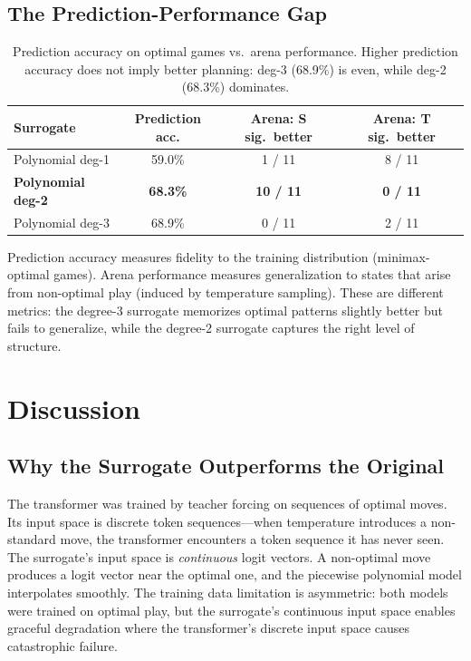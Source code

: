 \documentclass[11pt]{article}
\theoremstyle{definition}
\begin{document}
\subsection{The Prediction-Performance Gap}

\begin{table}[H]
\centering\small
\begin{tabular}{lccc}
\toprule
Surrogate & Prediction acc. & Arena: S sig.\ better & Arena: T sig.\ better \\
\midrule
Polynomial deg-1 & 59.0\% & 1 / 11 & 8 / 11 \\
\textbf{Polynomial deg-2} & \textbf{68.3\%} & \textbf{10 / 11} & \textbf{0 / 11} \\
Polynomial deg-3 & 68.9\% & 0 / 11 & 2 / 11 \\
\bottomrule
\end{tabular}
\caption{Prediction accuracy on optimal games vs.\ arena performance. Higher prediction accuracy does not imply better planning: deg-3 (68.9\%) is even, while deg-2 (68.3\%) dominates.}
\label{tab:gap}
\end{table}

Prediction accuracy measures fidelity to the training distribution (minimax-optimal games). Arena performance measures generalization to states that arise from non-optimal play (induced by temperature sampling). These are different metrics: the degree-3 surrogate memorizes optimal patterns slightly better but fails to generalize, while the degree-2 surrogate captures the right level of structure.

\section{Discussion}\label{sec:discussion}

\subsection{Why the Surrogate Outperforms the Original}

The transformer was trained by teacher forcing on sequences of optimal moves. Its input space is discrete token sequences---when temperature introduces a non-standard move, the transformer encounters a token sequence it has never seen. The surrogate's input space is \emph{continuous} logit vectors. A non-optimal move produces a logit vector near the optimal one, and the piecewise polynomial model interpolates smoothly. The training data limitation is asymmetric: both models were trained on optimal play, but the surrogate's continuous input space enables graceful degradation where the transformer's discrete input space causes catastrophic failure.
\end{document}
